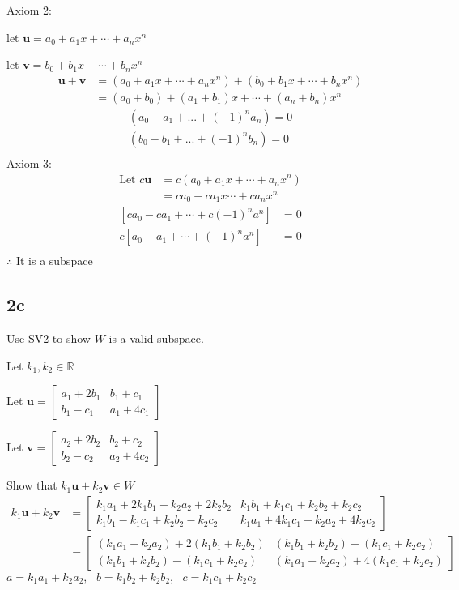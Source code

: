 \documentclass{article}
\begin{document}
\noindent
Axiom 2:

let $\mathbf{u} = a_0 + a_1x + \cdots + a_nx^n$

let $\mathbf{v} = b_0 + b_1x + \cdots + b_nx^n$
\begin{align*}
\mathbf{u} + \mathbf{v} &= (a_0 + a_1x + \cdots + a_nx^n) + (b_0 + b_1x + \cdots + b_nx^n)\\
&= (a_0 + b_0) + (a_1 + b_1)x + \cdots + (a_n + b_n)x^n
\end{align*}
\begin{align*}
\left(a_0 - a_1 + ... + (-1)^n a_n\right) = 0\\
\left(b_0 - b_1 + ... + (-1)^n b_n\right) = 0\\
\end{align*}
\noindent
Axiom 3:
\begin{align*}
\text{Let } c\mathbf{u} &= c\left(a_0 + a_1x + \cdots + a_n x^n\right)\\
&= ca_0 + ca_1x \cdots + ca_nx^n
\end{align*}
\begin{align*}
\left[ca_0 - ca_1 + \cdots +  c(-1)^na^n\right] &= 0\\
c\left[a_0 - a_1 + \cdots + (-1)^n a^n\right]&=0\\
\end{align*}
$\therefore$ It is a subspace

\subsection*{2c}
Use SV2 to show $W$ is a valid subspace.

Let $k_1, k_2 \in \mathbb{R}$

Let $\mathbf{u} = \begin{bmatrix}
a_1 + 2b_1 & b_1 + c_1\\
b_1 - c_1 & a_1 + 4c_1
\end{bmatrix}$

Let $\mathbf{v} = \begin{bmatrix}
a_2 + 2b_2 & b_2 + c_2\\
b_2 - c_2 & a_2 + 4c_2
\end{bmatrix}$

Show that $k_1 \mathbf{u} + k_2 \mathbf{v} \in W$
\begin{align*}
k_1 \mathbf{u} + k_2 \mathbf{v} &=
\begin{bmatrix}
k_1a_1 + 2 k_1 b_1 + k_2 a_2 + 2 k_2 b_2 & k_1 b_1 + k_1 c_1 + k_2 b_2 + k_2 c_2\\
k_1 b_1 - k_1 c_1 + k_2 b_2 - k_2 c_2 & k_1 a_1 + 4 k_1 c_1 + k_2 a_2 + 4 k_2 c_2
\end{bmatrix}\\
&= \begin{bmatrix}
(k_1 a_1 + k_2 a_2) + 2 (k_1 b_1 + k_2 b_2) & (k_1 b_1 + k_2 b_2) + (k_1 c_1  + k_2 c_2)\\
(k_1 b_1 + k_2 b_2) - (k_1 c_1 + k_2 c_2) & (k_1 a_1 + k_2 a_2) + 4 (k_1 c_1  + k_2 c_2)
\end{bmatrix}
\end{align*}
$a= k_1 a_1 + k_2 a_2,\text{ }b=k_1 b_2 + k_2 b_2,\text{ }c=k_1 c_1 + k_2 c_2$
\end{document}
